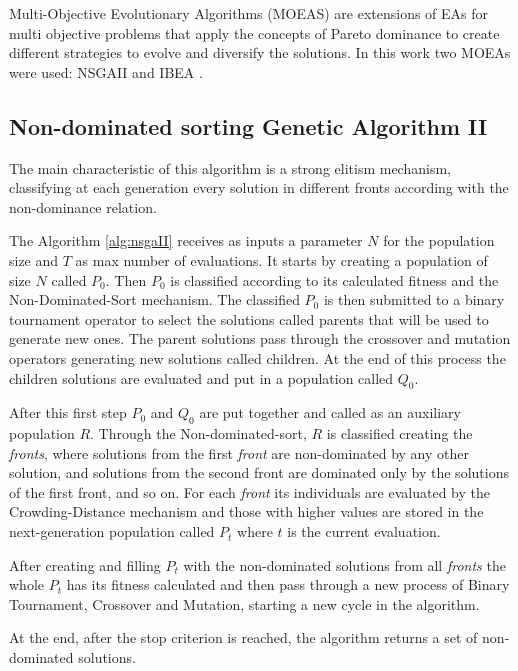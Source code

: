 Multi-Objective Evolutionary Algorithms (MOEAS) are extensions of EAs for multi objective problems that apply the concepts of Pareto dominance to create different strategies to evolve and diversify the solutions. In this work two MOEAs were used: NSGAII \cite{deb2002fast} and IBEA \cite{zitzler2004indicator}.


\subsection{Non-dominated sorting Genetic Algorithm II}


The main characteristic of this algorithm is a strong elitism mechanism, classifying at each generation every solution in different fronts according with the non-dominance relation.


The Algorithm \ref{alg:nsgaII} receives as inputs a parameter $N$ for the population size and $T$ as max number of evaluations. It starts by creating a population of size $N$ called $P_0$. Then $P_0$ is classified according to its calculated fitness and the Non-Dominated-Sort mechanism. The classified $P_0$ is then submitted to a binary tournament operator to select the solutions called parents that will be used to generate new ones. The parent solutions pass through the crossover and mutation operators generating new solutions called children. At the end of this process the children solutions are evaluated and put in a population called $Q_0$.


After this first step $P_0$ and $Q_0$ are put together and called as an auxiliary population $R$. Through the Non-dominated-sort, $R$ is classified creating the \textit{fronts}, where solutions from the first \textit{front} are non-dominated by any other solution, and solutions from the second front are dominated only by the solutions of the first front, and so on. For each \textit{front} its individuals are evaluated by the Crowding-Distance mechanism and those with higher values are stored in the next-generation population called $P_t$ where $t$ is the current evaluation.


After creating and filling $P_t$ with the non-dominated solutions from all \textit{fronts} the whole $P_t$ has its fitness calculated and then pass through a new process of Binary Tournament, Crossover and Mutation, starting a new cycle in the algorithm.


At the end, after the stop criterion is reached, the algorithm returns a set of non-dominated  solutions.


